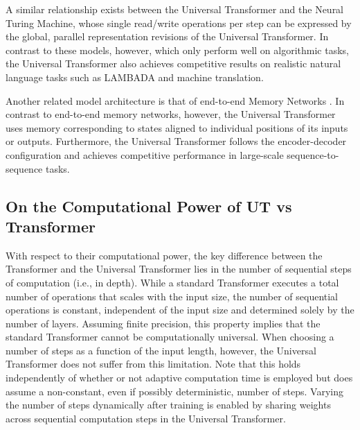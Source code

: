 A similar relationship exists between the Universal Transformer and the Neural Turing Machine, whose single read/write operations per step can be expressed by the global, parallel representation revisions of the Universal Transformer. In contrast to these models, however, which only perform well on algorithmic tasks, the Universal Transformer also achieves competitive results on realistic natural language tasks such as LAMBADA and machine translation.

Another related model architecture is that of end-to-end Memory Networks \citep{sukhbaatar2015}. In contrast to end-to-end memory networks, however, the Universal Transformer uses memory corresponding to states aligned to individual positions of its inputs or outputs. Furthermore, the Universal Transformer follows the encoder-decoder configuration and achieves competitive performance in large-scale sequence-to-sequence tasks.


\subsection{On the Computational Power of UT vs Transformer}
\label{app:univerrality_example}

With respect to their computational power, the key difference between the Transformer and the Universal Transformer lies in the number of sequential steps of computation (i.e., in depth). While a standard Transformer executes a total number of operations that scales with the input size, the number of sequential operations is constant, independent of the input size and determined solely by the number of layers. Assuming finite precision, this property implies that the standard Transformer cannot be computationally universal. When choosing a number of steps as a function of the input length, however, the Universal Transformer does not suffer from this limitation. Note that this holds independently of whether or not adaptive computation time is employed but does assume a non-constant, even if possibly deterministic, number of steps. Varying the number of steps dynamically after training is enabled by sharing weights across sequential computation steps in the Universal Transformer.


